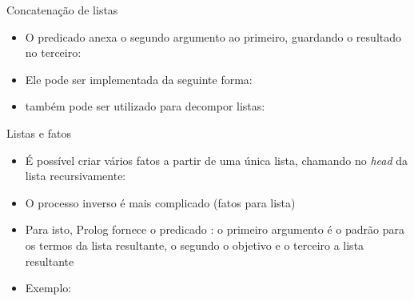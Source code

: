 \begin{frame}[fragile]{Concatenação de listas}

    \begin{itemize}
        \item O predicado  anexa o segundo argumento ao primeiro, 
            guardando o resultado no terceiro:


        \item Ele pode ser implementada da seguinte forma:


        \item {} também pode ser utilizado para decompor listas:

    \end{itemize}


\end{frame}

\begin{frame}[fragile]{Listas e fatos}

    \begin{itemize}
        \item É possível criar vários fatos a partir de uma única lista, chamando 
            no \textit{head} da lista recursivamente:


        \item O processo inverso é mais complicado (fatos para lista)

        \item Para isto, Prolog fornece o predicado : o primeiro 
            argumento é o padrão para os termos da lista resultante, o segundo o objetivo e o 
            terceiro a lista resultante

        \item Exemplo:


    \end{itemize}

\end{frame}
